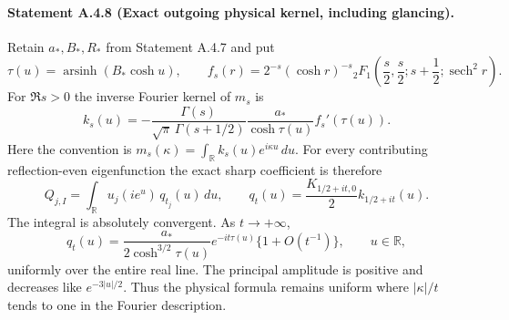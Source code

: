 \paragraph{Statement A.4.8 (Exact outgoing physical kernel, including glancing).}
Retain $a_*,B_*,R_*$ from Statement A.4.7 and put
\[
 \tau(u)=\operatorname{arsinh}(B_*\cosh u),\qquad
 f_s(r)=2^{-s}(\cosh r)^{-s}
 {}_2F_1\!\left(\frac s2,\frac s2;s+\frac12;\operatorname{sech}^2r\right).
\]
For $\Re s>0$ the inverse Fourier kernel of $m_s$ is
\begin{equation}\label{A:exact-physical-kernel}
 k_s(u)=-\frac{\Gamma(s)}{\sqrt\pi\,\Gamma(s+1/2)}
          \frac{a_*}{\cosh\tau(u)}f_s'(\tau(u)).
\end{equation}
Here the convention is
$m_s(\kappa)=\int_{\mathbb R}k_s(u)e^{i\kappa u}\,du$.
For every contributing reflection-even eigenfunction the exact sharp
coefficient is therefore
\begin{equation}\label{A:Q-physical}
 Q_{j,I}=\int_{\mathbb R}u_j(i e^u)\,q_{t_j}(u)\,du,
 \qquad q_t(u)=\frac{K_{1/2+it,0}}2 k_{1/2+it}(u).
\end{equation}
The integral is absolutely convergent. As $t\to+\infty$,
\begin{equation}\label{A:physical-principal-symbol}
 q_t(u)=
 \frac{a_*}{2\cosh^{3/2}\tau(u)}
       e^{-it\tau(u)}\{1+O(t^{-1})\},
 \qquad u\in\mathbb R,
\end{equation}
uniformly over the entire real line.
The principal amplitude is positive and decreases like
$e^{-3|u|/2}$. Thus the physical formula remains uniform where
$|\kappa|/t$ tends to one in the Fourier description.

